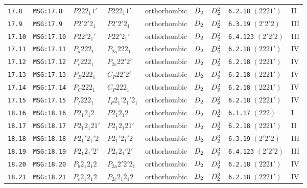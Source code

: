 \documentclass[fleqn,10pt]{jsarticle}
\begin{document}
\begin{center}
\begin{longtable}{lllllllll}
\texttt{17.8} & \texttt{MSG:17.8} & $P222_{1}1'$ & $P222_{1}1'$ & orthorhombic & $D_{\rm 2}$ & $D_{\rm 2}^{2}$ & \texttt{6.2.18} $(2221')$ & II \\
\texttt{17.9} & \texttt{MSG:17.9} & $P2'2'2_{1}$ & $P2'2'2_{1}$ & orthorhombic & $D_{\rm 2}$ & $D_{\rm 2}^{2}$ & \texttt{6.3.19} $(2'2'2)$ & III \\
\texttt{17.10} & \texttt{MSG:17.10} & $P22'2_{1}'$ & $P22'2_{1}'$ & orthorhombic & $D_{\rm 2}$ & $D_{\rm 2}^{2}$ & \texttt{6.4.123} $(2'2'2)$ & III \\
\texttt{17.11} & \texttt{MSG:17.11} & $P_{a}222_{1}$ & $P_{2a}222_{1}$ & orthorhombic & $D_{\rm 2}$ & $D_{\rm 2}^{2}$ & \texttt{6.2.18} $(2221')$ & IV \\
\texttt{17.12} & \texttt{MSG:17.12} & $P_{c}222_{1}$ & $P_{2c}22'2'$ & orthorhombic & $D_{\rm 2}$ & $D_{\rm 2}^{2}$ & \texttt{6.2.18} $(2221')$ & IV \\
\texttt{17.13} & \texttt{MSG:17.13} & $P_{B}222_{1}$ & $C_{P}22'2'$ & orthorhombic & $D_{\rm 2}$ & $D_{\rm 2}^{2}$ & \texttt{6.2.18} $(2221')$ & IV \\
\texttt{17.14} & \texttt{MSG:17.14} & $P_{C}222_{1}$ & $C_{P}222_{1}$ & orthorhombic & $D_{\rm 2}$ & $D_{\rm 2}^{2}$ & \texttt{6.2.18} $(2221')$ & IV \\
\texttt{17.15} & \texttt{MSG:17.15} & $P_{I}222_{1}$ & $I_{P}2_{1}'2_{1}'2_{1}$ & orthorhombic & $D_{\rm 2}$ & $D_{\rm 2}^{2}$ & \texttt{6.2.18} $(2221')$ & IV \\ \hline
\texttt{18.16} & \texttt{MSG:18.16} & $P2_{1}2_{1}2$ & $P2_{1}2_{1}2$ & orthorhombic & $D_{\rm 2}$ & $D_{\rm 2}^{3}$ & \texttt{6.1.17} $(222)$ & I \\
\texttt{18.17} & \texttt{MSG:18.17} & $P2_{1}2_{1}21'$ & $P2_{1}2_{1}21'$ & orthorhombic & $D_{\rm 2}$ & $D_{\rm 2}^{3}$ & \texttt{6.2.18} $(2221')$ & II \\
\texttt{18.18} & \texttt{MSG:18.18} & $P2_{1}'2_{1}'2$ & $P2_{1}'2_{1}'2$ & orthorhombic & $D_{\rm 2}$ & $D_{\rm 2}^{3}$ & \texttt{6.3.19} $(2'2'2)$ & III \\
\texttt{18.19} & \texttt{MSG:18.19} & $P2_{1}2_{1}'2'$ & $P2_{1}2_{1}'2'$ & orthorhombic & $D_{\rm 2}$ & $D_{\rm 2}^{3}$ & \texttt{6.4.123} $(2'2'2)$ & III \\
\texttt{18.20} & \texttt{MSG:18.20} & $P_{b}2_{1}2_{1}2$ & $P_{2a}2'2'2_{1}$ & orthorhombic & $D_{\rm 2}$ & $D_{\rm 2}^{3}$ & \texttt{6.2.18} $(2221')$ & IV \\
\texttt{18.21} & \texttt{MSG:18.21} & $P_{c}2_{1}2_{1}2$ & $P_{2c}2_{1}2_{1}2$ & orthorhombic & $D_{\rm 2}$ & $D_{\rm 2}^{3}$ & \texttt{6.2.18} $(2221')$ & IV \\

\end{longtable}
\end{center}
\end{document}
